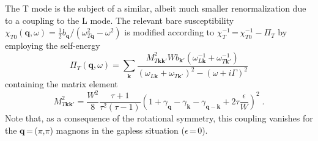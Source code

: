 \documentclass[twocolumn,prb,aps,showpacs]{revtex4-1}
\newcommand{\vc}[1]{\boldsymbol{#1}}
\begin{document}
The T mode is the subject of a similar, albeit much smaller
renormalization due to a coupling to the L mode. 
The relevant bare susceptibility
$\chi_{T0}(\vc q,\omega)=\frac12 b_{\vc q}/(\omega_{T\vc q}^2-\omega^2)$
is modified according to $\chi_T^{-1}$\,=\,$\chi_{T0}^{-1}-\Pi_T$
by employing the self-energy
\begin{equation}
\Pi_T(\vc q,\omega) = \sum_{\vc k}
\frac{ M^2_{T\vc k\vc k'} W b_{\vc k'} 
(\omega^{-1}_{L\vc k}+\omega^{-1}_{T\vc k'}) }
{(\omega_{L\vc k}+\omega_{T\vc k'})^2-(\omega+i\Gamma)^2} 
\end{equation}
containing the matrix element
\begin{equation}
M^2_{T\vc k\vc k'}= \frac{W^2}8 \frac{\tau+1}{\tau^2(\tau-1)}
\left(1\!+\!\gamma_{\vc q}\!-\!\gamma_{\vc k}\!-\!\gamma_{\vc q-\vc k} 
\!+\! 2\tau \frac{\epsilon}W \right)^2 \;.
\end{equation}	
Note that, as a consequence of the rotational symmetry, this coupling vanishes
for the $\vc q$\,=\,($\pi$,$\pi$) magnons in the gapless situation ($\epsilon$\,=\,0).






\end{document}
